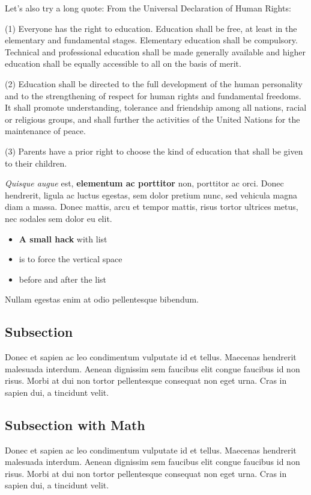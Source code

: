 \documentclass[11pt,a4paper,oneside,article]{memoir}
\renewenvironment{quote}
  {\list{}{\rightmargin=0pt\leftmargin=1cm\topsep=-10pt}%
  \item\relax\fontsize{10pt}{10pt}\singlespacing}
  {\endlist}
\begin{document}
Let's also try a long quote:
From the Universal Declaration of Human Rights:
\begin{quote}
(1) Everyone has the right to education. Education shall be free, at least in the elementary and fundamental stages. Elementary education shall be compulsory. Technical and professional education shall be made generally available and higher education shall be equally accessible to all on the basis of merit.

(2) Education shall be directed to the full development of the human personality and to the strengthening of respect for human rights and fundamental freedoms. It shall promote understanding, tolerance and friendship among all nations, racial or religious groups, and shall further the activities of the United Nations for the maintenance of peace.

(3) Parents have a prior right to choose the kind of education that shall be given to their children. \cite[article 26]{un:udhr}
\end{quote}

\textit{Quisque augue} est, \textbf{elementum ac porttitor} non, porttitor ac orci. Donec hendrerit, ligula ac luctus egestas, sem dolor pretium nunc, sed vehicula magna diam a massa. Donec mattis, arcu et tempor mattis, risus tortor ultrices metus, nec sodales sem dolor eu elit.\vspace{-17pt} 
\begin{itemize}
\item \textbf{A small hack} with list
\item is to force the vertical space 
\item before and after the list
\end{itemize}
\vspace{-17pt} Nullam egestas enim at odio pellentesque bibendum. 

\subsection{Subsection}
Donec et sapien ac leo condimentum vulputate id et tellus. Maecenas hendrerit malesuada interdum. Aenean dignissim sem faucibus elit congue faucibus id non risus. Morbi at dui non tortor pellentesque consequat non eget urna. Cras in sapien dui, a tincidunt velit.

\subsection{Subsection with Math}
Donec et sapien ac leo condimentum vulputate id et tellus. Maecenas hendrerit malesuada interdum. Aenean dignissim sem faucibus elit congue faucibus id non risus. Morbi at dui non tortor pellentesque consequat non eget urna. Cras in sapien dui, a tincidunt velit.
\end{document}

